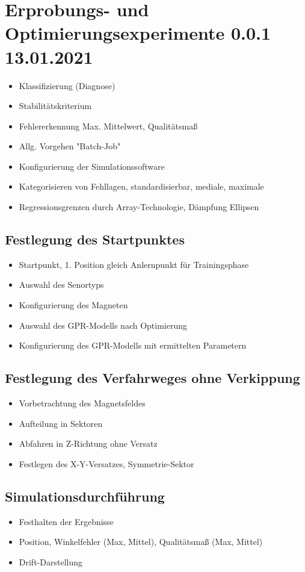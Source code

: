 %

\chapter{Erprobungs- und Optimierungsexperimente 0.0.1 13.01.2021}\label{ch:erprobungs-u-opt-exp}
	\begin{itemize}
		\item Klassifizierung (Diagnose)
		\item Stabilitätskriterium
		\item Fehlererkennung Max. Mittelwert, Qualitätsmaß
		\item Allg. Vorgehen "Batch-Job"
		\item Konfigurierung der Simulationssoftware
		\item Kategorisieren von Fehllagen, standardisierbar, mediale, maximale
		\item Regressionsgrenzen durch Array-Technologie, Dämpfung Ellipsen
	\end{itemize}

\section{Festlegung des Startpunktes}\label{sec:festlegung-des-startpunktes}
	\begin{itemize}
		\item Startpunkt, 1. Position gleich Anlernpunkt für Trainingsphase
		\item Auswahl des Senortyps
		\item Konfigurierung des Magneten
		\item Auswahl des GPR-Modells nach Optimierung
		\item Konfigurierung des GPR-Modells mit ermittelten Parametern
	\end{itemize}




\section{Festlegung des Verfahrweges ohne Verkippung}\label{sec:festlegung-verfahrwe-ohne-verkippung}
	\begin{itemize}
		\item Vorbetrachtung des Magnetsfeldes 
		\item Aufteilung in Sektoren
		\item Abfahren in Z-Richtung ohne Versatz
		\item Festlegen des X-Y-Versatzes, Symmetrie-Sektor		
	\end{itemize}

\section{Simulationsdurchführung}\label{sec:simulationsdurchfuehrung}
	\begin{itemize}
		\item Festhalten der Ergebnisse
		\item Position, Winkelfehler (Max, Mittel), Qualitätsmaß (Max, Mittel)
		\item Drift-Darstellung
	\end{itemize}
	
